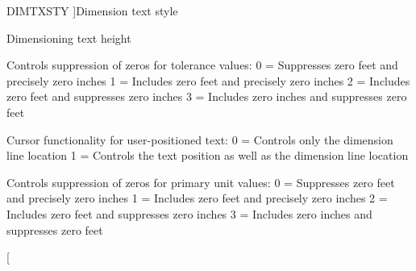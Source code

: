 \begin{Desc}
\begin{description}
{D\+I\+M\+T\+X\+S\+TY\hypertarget{class_c_a_d_header_abd894aab7aa85b4c4634e67fb93d6886a3223469c7cb866d22d389b45060a920a}{}\label{class_c_a_d_header_abd894aab7aa85b4c4634e67fb93d6886a3223469c7cb866d22d389b45060a920a}
}]Dimension text style \item[{\em 
D\+I\+M\+T\+XT\hypertarget{class_c_a_d_header_abd894aab7aa85b4c4634e67fb93d6886a9f93c170199ee719a94ed7dcb482d8c3}{}\label{class_c_a_d_header_abd894aab7aa85b4c4634e67fb93d6886a9f93c170199ee719a94ed7dcb482d8c3}
}]Dimensioning text height \item[{\em 
D\+I\+M\+T\+Z\+IN\hypertarget{class_c_a_d_header_abd894aab7aa85b4c4634e67fb93d6886a68c9a8fdd8634ef564eb40b29a7ce014}{}\label{class_c_a_d_header_abd894aab7aa85b4c4634e67fb93d6886a68c9a8fdd8634ef564eb40b29a7ce014}
}]Controls suppression of zeros for tolerance values\+: 0 = Suppresses zero feet and precisely zero inches 1 = Includes zero feet and precisely zero inches 2 = Includes zero feet and suppresses zero inches 3 = Includes zero inches and suppresses zero feet \item[{\em 
D\+I\+M\+U\+PT\hypertarget{class_c_a_d_header_abd894aab7aa85b4c4634e67fb93d6886a296f52bfbcf9bfd3846c2766078d871c}{}\label{class_c_a_d_header_abd894aab7aa85b4c4634e67fb93d6886a296f52bfbcf9bfd3846c2766078d871c}
}]Cursor functionality for user-\/positioned text\+: 0 = Controls only the dimension line location 1 = Controls the text position as well as the dimension line location \item[{\em 
D\+I\+M\+Z\+IN\hypertarget{class_c_a_d_header_abd894aab7aa85b4c4634e67fb93d6886a35307893fd6f5cd7af23123a47c2b93e}{}\label{class_c_a_d_header_abd894aab7aa85b4c4634e67fb93d6886a35307893fd6f5cd7af23123a47c2b93e}
}]Controls suppression of zeros for primary unit values\+: 0 = Suppresses zero feet and precisely zero inches 1 = Includes zero feet and precisely zero inches 2 = Includes zero feet and suppresses zero inches 3 = Includes zero inches and suppresses zero feet \item[{\em 
}
\end{description}
\end{Desc}
